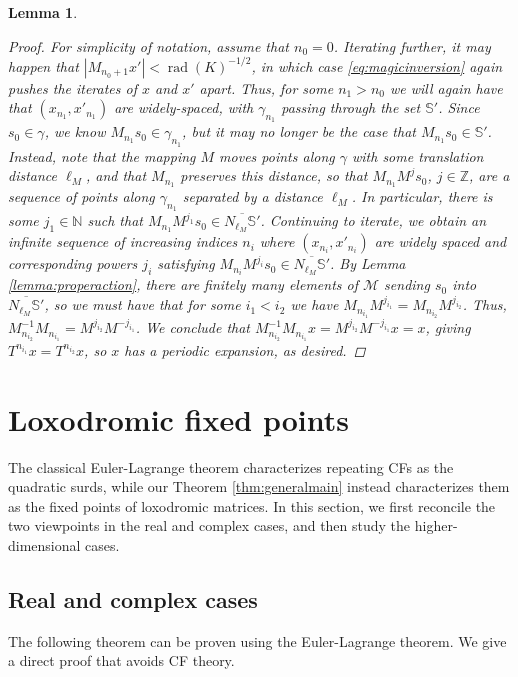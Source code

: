\documentclass[reqno,10pt]{amsart}
\newcommand{\N}{\mathbb{N}}
\newcommand{\norm}[1]{\left\vert #1 \right \vert}
\newcommand{\rad}{\operatorname{rad}}
\newtheorem{lemma}[thm]{Lemma}
\numberwithin{thm}{section}
\theoremstyle{definition}
\theoremstyle{definition}
\numberwithin{equation}{section}
\newcommand{\Mod}{\mathcal M}
\newcommand{\Sph}{\mathbb S}
\begin{document}
\begin{lemma}
\begin{proof}
For simplicity of notation, assume that $n_0=0$. Iterating further, it may happen that $\norm{M_{n_0+1}x'}<\rad(K)^{-1/2}$, in which case \eqref{eq:magicinversion} again pushes the iterates of $x$ and $x'$ apart. Thus, for some $n_1>n_0$ we will again have that $(x_{n_1},x'_{n_1})$ are widely-spaced, with $\gamma_{n_1}$ passing through the set $\Sph'$. Since $s_0\in \gamma$, we know $M_{n_1} s_0\in \gamma_{n_1}$, but it may no longer be the case that $M_{n_1} s_0\in \Sph'$. Instead, note that the mapping $M$ moves points along $\gamma$ with some translation distance $\ell_M$, and that $M_{n_1}$ preserves this distance, so that $M_{n_1} M^j s_0$, $j\in \mathbb{Z}$, are a sequence of points along $\gamma_{n_1}$ separated by a distance $\ell_M$. In particular, there is some $j_1\in \N$ such that $M_{n_1} M^{j_1} s_0\in \overline{N_{\ell_M}\Sph'}$. Continuing to iterate, we obtain an infinite sequence of increasing indices $n_i$ where $(x_{n_i},x'_{n_i})$ are widely spaced and corresponding powers $j_i$ satisfying  $M_{n_i} M^{j_i} s_0\in \overline{N_{\ell_M}\Sph'}$. By Lemma \ref{lemma:properaction}, there are finitely many elements of $\Mod$ sending $s_0$ into $\overline{N_{\ell_M}\Sph'}$, so we must have that for some $i_1<i_2$ we have $M_{n_{i_1}}M^{j_{i_1}}=M_{n_{i_2}}M^{j_{i_2}}$. Thus, $M^{-1}_{n_{i_2}}M_{n_{i_1}}=M^{j_{i_2}}M^{-j_{i_1}}$. We conclude that $M^{-1}_{n_{i_2}}M_{n_{i_1}}x=M^{j_{i_2}}M^{-j_{i_1}}x=x$, giving $T^{n_{i_1}}x = T^{n_{i_2}}x$, so $x$ has a periodic expansion, as desired.

\end{proof}
\end{lemma}
\section{Loxodromic fixed points}
\label{sec:loxodromic}

The classical Euler-Lagrange theorem characterizes repeating CFs as the quadratic surds, while our Theorem \ref{thm:generalmain} instead characterizes them as the fixed points of loxodromic matrices. In this section, we first reconcile the two viewpoints in the real and complex cases, and then study the higher-dimensional cases.

\subsection{Real and complex cases}\label{sec:backwardscompatability} 
The following theorem can be proven using the Euler-Lagrange theorem. We give a direct proof that avoids CF theory. 
\end{document}
